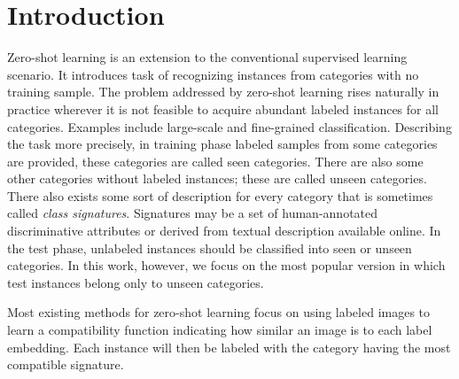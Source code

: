 \documentclass[10pt,twocolumn,letterpaper]{article}
\begin{document}
\section{Introduction}
Zero-shot learning is an extension to the conventional supervised learning scenario.
It introduces task of recognizing instances from categories with no training sample.
 The problem addressed by zero-shot learning rises naturally in practice wherever it is not feasible to acquire abundant labeled instances
 for all categories. Examples include large-scale and fine-grained classification.
Describing the task more precisely, in training phase labeled samples from some categories are provided,
these categories are called seen categories. There are also some other categories without labeled instances; these are called unseen categories.
There also exists some sort of description for every category that is sometimes called \textit{class signatures}.
Signatures may be a set of human-annotated discriminative attributes or derived from textual description available online.
In the test phase, unlabeled instances should be classified into seen or unseen categories. In this work, however, we focus on the most popular version
in which test instances belong only to unseen categories.

Most existing methods for zero-shot learning focus on using labeled images to learn a compatibility function indicating how similar an image is
to each label embedding. Each instance will then be labeled with the category having the most compatible signature.
\end{document}
